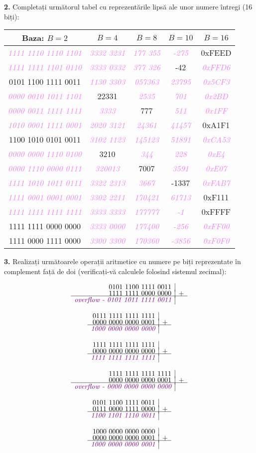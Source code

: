 \documentclass[a4paper]{article}
\renewcommand{\arraystretch}{1.4}
\newcommand{\hl}[1]{\textcolor{violet}{\textit{#1}}}
\newcommand{\binarysum}[3]{%
    \[
    \begin{array}{r|l}
    \text{#1} \\[-3pt]
    \text{#2} & + \\[-3pt]
    \hline
    \hl{#3} \\
    \end{array}
    \]
}
\begin{document}
\textbf{2.} Completați următorul tabel cu reprezentările lipsă ale unor numere întregi (16 biți):
\begin{table}[h!]
\centering
\renewcommand{\arraystretch}{1.3}
\setlength{\tabcolsep}{10pt}
\begin{tabular}{|c|c|c|c|c|}
\hline
\textbf{Baza: $B=2$} & \textbf{$B=4$} & \textbf{$B=8$} & \textbf{$B=10$} & \textbf{$B=16$} \\ \hline
 \hl{1111 1110 1110 1101} & \hl{3332 3231} & \hl{177 355} & \hl{-275} & 0xFEED \\ \hline
 \hl{1111 1111 1101 0110} & \hl{3333 0332} & \hl{377 326} & -42 & \hl{0xFFD6} \\ \hline
 0101 1100 1111 0011 & \hl{1130 3303} & \hl{057363} & \hl{23795} & \hl{0x5CF3} \\ \hline
 \hl{0000 0010 1011 1101} & 22331 & \hl{2535} & \hl{701} & \hl{0x2BD} \\ \hline
 \hl{0000 0011 1111 1111} & \hl{3333} & 777 & \hl{511} & \hl{0x1FF} \\ \hline
 \hl{1010 0001 1111 0001} & \hl{2020 3121} & \hl{24361} & \hl{41457} & 0xA1F1\\ \hline
 1100 1010 0101 0011 & \hl{3102 1123} & \hl{145123} & \hl{51891} & \hl{0xCA53} \\ \hline
 \hl{0000 0000 1110 0100} & 3210 & \hl{344} & \hl{228} & \hl{0xE4} \\ \hline
 \hl{0000 1110 0000 0111} & \hl{320013} & 7007 & \hl{3591} & \hl{0xE07} \\ \hline
 \hl{1111 1010 1011 0111} & \hl{3322 2313} & \hl{3667} & -1337 & \hl{0xFAB7} \\ \hline
 \hl{1111 0001 0001 0001} & \hl{3302 2211} & \hl{170421} & \hl{61713} & 0xF111 \\ \hline
 \hl{1111 1111 1111 1111} & \hl{3333 3333} & \hl{177777} & \hl{-1} & 0xFFFF \\ \hline
 1111 1111 0000 0000 & \hl{3333 0000} & \hl{177400} & \hl{-256} & \hl{0xFF00} \\ \hline
 1111 0000 1111 0000 & \hl{3300 3300} & \hl{170360} & \hl{-3856} & \hl{0xF0F0} \\ \hline
\end{tabular}
\end{table}
\vspace{0.75cm}

\textbf{3.} Realizați următoarele operații aritmetice cu numere pe biți reprezentate în complement față de doi (verificați-vă calculele folosind sistemul zecimal):
\begin{multicols}{2}
\binarysum{0101 1100 1111 0011}{1111 1111 0000 0000}{\textit{overflow} - \hl{0101 1011 1111 0011}}
\binarysum{0111 1111 1111 1111}{0000 0000 0000 0001}{\hl{1000 0000 0000 0000}}
\binarysum{1111 1111 1111 1111}{0000 0000 0000 0000}{\hl{1111 1111 1111 1111}}
\binarysum{1111 1111 1111 1111}{0000 0000 0000 0001}{\textit{overflow} - \hl{0000 0000 0000 0000}}
\binarysum{0101 1100 1111 0011}{0111 0000 1111 0000}{\hl{1100 1101 1110 0011}}
\binarysum{1000 0000 0000 0000}{0000 0000 0000 0001}{\hl{1000 0000 0000 0001}}
\end{multicols}
\end{document}
